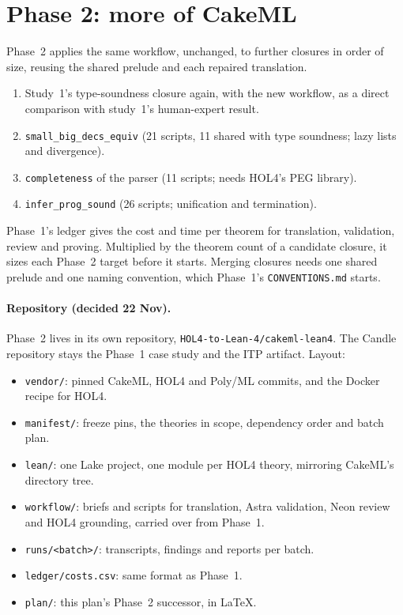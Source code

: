 \documentclass[11pt,a4paper]{article}
\newcommand{\code}[1]{\texttt{#1}}
\begin{document}
\section{Phase 2: more of CakeML}\label{sec:phase2}
Phase~2 applies the same workflow, unchanged, to further closures in order of size, reusing the shared prelude and each repaired translation.
\begin{enumerate}
\item Study~1's type-soundness closure again, with the new workflow, as a direct comparison with study~1's human-expert result.
\item \code{small\_big\_decs\_equiv} (21 scripts, 11 shared with type soundness; lazy lists and divergence).
\item \code{completeness} of the parser (11 scripts; needs HOL4's PEG library).
\item \code{infer\_prog\_sound} (26 scripts; unification and termination).
\end{enumerate}
Phase~1's ledger gives the cost and time per theorem for translation, validation, review and proving. Multiplied by the theorem count of a candidate closure, it sizes each Phase~2 target before it starts. Merging closures needs one shared prelude and one naming convention, which Phase~1's \code{CONVENTIONS.md} starts.

\paragraph{Repository (decided 22 Nov).} Phase~2 lives in its own repository, \code{HOL4-to-Lean-4/cakeml-lean4}. The Candle repository stays the Phase~1 case study and the ITP artifact. Layout:
\begin{itemize}
\item \code{vendor/}: pinned CakeML, HOL4 and Poly/ML commits, and the Docker recipe for HOL4.
\item \code{manifest/}: freeze pins, the theories in scope, dependency order and batch plan.
\item \code{lean/}: one Lake project, one module per HOL4 theory, mirroring CakeML's directory tree.
\item \code{workflow/}: briefs and scripts for translation, Astra validation, Neon review and HOL4 grounding, carried over from Phase~1.
\item \code{runs/<batch>/}: transcripts, findings and reports per batch.
\item \code{ledger/costs.csv}: same format as Phase~1.
\item \code{plan/}: this plan's Phase~2 successor, in \LaTeX.
\end{itemize}
\end{document}
